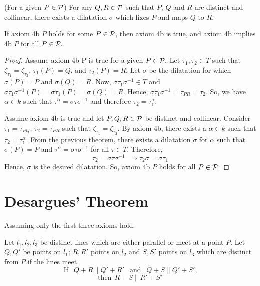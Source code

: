 \begin{axiom}[4b $P$]
    (For a given $P \in \mathcal{P}$) For any $Q,R \in \mathcal{P}$ such that $P$, $Q$ and $R$ are distinct and collinear, there exists a dilatation $\sigma$ which fixes $P$ and maps $Q$ to $R$.
\end{axiom}

\begin{theorem}
    If axiom 4b $P$ holds for some $P \in \mathcal{P}$, then axiom 4b is true, and axiom 4b implies 4b $P$ for all $P \in \mathcal{P}.$
\end{theorem}

\begin{proof}
    Assume axiom 4b P is true for a given $P \in \mathcal{P}.$ Let $\tau_1, \tau_2 \in T$ such that $\zeta_{\tau_1} = \zeta_{\tau_2}$, $\tau_1(P)=Q$, and $\tau_2(P)=R$. Let $\sigma$ be the dilatation for which $\sigma(P)=P$ and $\sigma(Q)=R$. Now, $\sigma\tau_1\sigma^{-1} \in T$ and $\sigma\tau_1\sigma^{-1}(P) = \sigma\tau_1(P)=\sigma(Q)=R. $ Hence, $\sigma\tau_1\sigma^{-1} = \tau_{PR}=\tau_2$. So, we have $\alpha \in k$ such that $\tau^\alpha = \sigma\tau\sigma^{-1}$ and therefore $\tau_2=\tau_1^\alpha.$

    Assume axiom 4b is true and let $P,Q,R \in \mathcal{P}$ be distinct and collinear. Consider $\tau_1=\tau_{PQ}$, $\tau_2=\tau_{PR}$ such that $\zeta_{\tau_1} = \zeta_{\tau_2}$. By axiom 4b, there exists a $\alpha \in k$ such that $\tau_2=\tau_1^\alpha$. From the previous theorem, there exists a dilatation $\sigma$ for $\alpha$ such that $\sigma(P)=P$ and $\tau^{\alpha} = \sigma\tau\sigma^{-1}$ for all $\tau \in T.$ Therefore,
    \[
    \tau_2=\sigma\tau\sigma^{-1} \implies \tau_2\sigma=\sigma\tau_1
    \]
    Hence, $\sigma$ is the desired dilatation. So, axiom 4b $P$ holds for all $P \in \mathcal{P}$.
\end{proof}

\section{Desargues' Theorem}

Assuming only the first three axioms hold. 

\begin{theorem}
    Let $l_1, l_2, l_3$ be distinct lines which are either parallel or meet at a point $P$. Let $Q, Q'$ be points on $l_1$; $R, R'$ points on $l_2$ and $S, S'$ points on $l_3$ which are distinct from $P$ if the lines meet.
    \[
    \text{If } \: \: Q+R \parallel Q'+R' \: \:  \text{ and } \: \: Q+S \parallel Q' +S'\text{,}
    \]
    \[
    \text{then} \: \: R+S \parallel R'+S'
    \]
\end{theorem}


